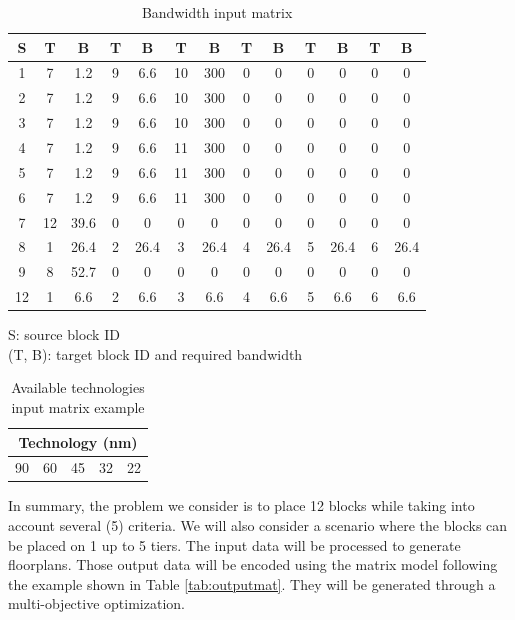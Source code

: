\begin{table}[h!]
\caption{Bandwidth input matrix}
\begin{center}
\begin{scriptsize}
\begin{tabular}{|c|c|c|c|c|c|c|c|c|c|c|c|c|}
\hline S & T & B & T & B & T & B & T & B & T & B & T & B \\
\hline 1 & 7 & 1.2 & 9 & 6.6 & 10 & 300 & 0 & 0 & 0 & 0 & 0 & 0\\
2 & 7 & 1.2 & 9 & 6.6 & 10 & 300 & 0 & 0 & 0 & 0 & 0 & 0\\
3 & 7 & 1.2 & 9 & 6.6 & 10 & 300 & 0 & 0 & 0 & 0 & 0 & 0\\
4 & 7 & 1.2 & 9 & 6.6 & 11 & 300 & 0 & 0 & 0 & 0 & 0 & 0\\
5 & 7 & 1.2 & 9 & 6.6 & 11 & 300 & 0 & 0 & 0 & 0 & 0 & 0\\
6 & 7 & 1.2 & 9 & 6.6 & 11 & 300 & 0 & 0 & 0 & 0 & 0 & 0\\
7 & 12 & 39.6 & 0 & 0 & 0 & 0 & 0 & 0 & 0 & 0 & 0 & 0\\
8 & 1 & 26.4 & 2 & 26.4 & 3 & 26.4 & 4 & 26.4 & 5 & 26.4 & 6 & 26.4\\
9 & 8 & 52.7 & 0 & 0 & 0 & 0 & 0 & 0 & 0 & 0 & 0 & 0\\
12 & 1 & 6.6 & 2 & 6.6 & 3 & 6.6 & 4 & 6.6 & 5 & 6.6 & 6 & 6.6\\
\hline
\end{tabular}
\end{scriptsize}
\end{center}
\begin{center}
S: source block ID\\
(T, B): target block ID and required bandwidth
\end{center}
\label{tab:bwmatrix}
\end{table}

\begin{table}[h!]
\caption{Available technologies input matrix example}
\begin{center}
\begin{tabular}{|c|c|c|c|c|}
\hline \multicolumn{5}{|c|}{Technology (nm)}\\
\hline 90 & 60 & 45 & 32 & 22\\
\hline
\end{tabular}
\end{center}
\label{tab:tech}
\end{table}

In summary, the problem we consider is to place 12 blocks while taking into account several (5) criteria. We will also consider a scenario where the blocks can be placed on 1 up to 5 tiers. The input data will be processed to generate floorplans. Those output data will be encoded using the matrix model following the example shown in Table \ref{tab:outputmat}. They will be generated through a multi-objective optimization.

